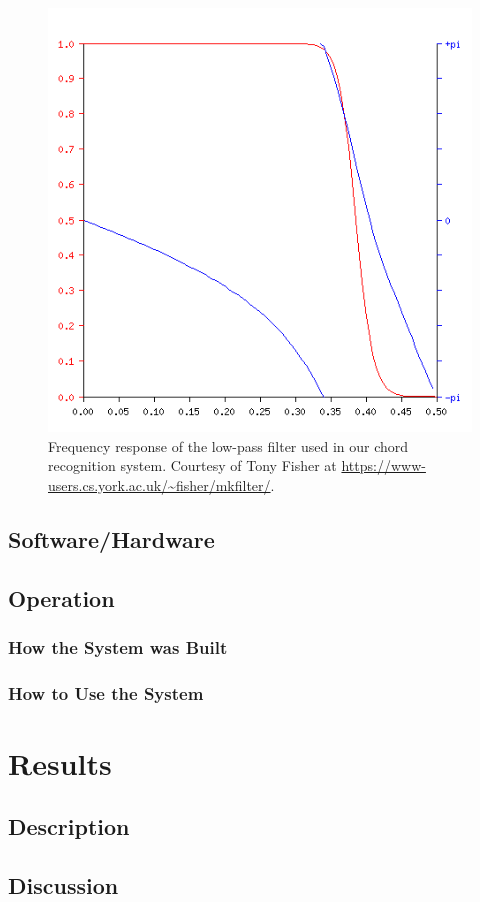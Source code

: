 \documentclass[journal]{IEEEtran}
\begin{document}
\begin{figure}[t]
    \centering
    \includegraphics[width=\linewidth]{../Figures/frequency_response}
    \caption{Frequency response of the low-pass filter used in our chord recognition system.
    Courtesy of Tony Fisher at \url{https://www-users.cs.york.ac.uk/~fisher/mkfilter/}.}
    \label{fig:frequency_response}
\end{figure}

\subsection{Software/Hardware}

\subsection{Operation}

\subsubsection{How the System was Built}

\subsubsection{How to Use the System}

\section{Results}
\subsection{Description}
\subsection{Discussion}



\end{document}
